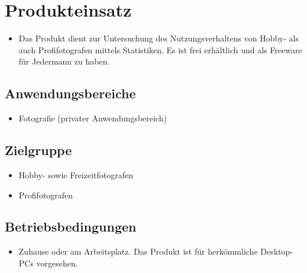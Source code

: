 \section{Produkteinsatz}
  \begin{itemize}
  \item Das Produkt dient zur Untersuchung des Nutzungsverhaltens von Hobby- als auch Profifotografen mittels Statistiken. Es ist frei erhältlich und als Freeware für Jedermann zu haben.
  \end{itemize}
\subsection{Anwendungsbereiche}
  \begin{itemize}
  \item Fotografie (privater Anwendungsbereich) 
  \end{itemize}

\subsection{Zielgruppe}
	\begin{itemize}
		\item Hobby- sowie Freizeitfotografen
		\item Profifotografen		
	\end{itemize}

\subsection{Betriebsbedingungen}
  \begin{itemize}
  		\item Zuhause oder am Arbeitsplatz. Das Produkt ist für herkömmliche Desktop-PCs vorgesehen.
  \end{itemize}
